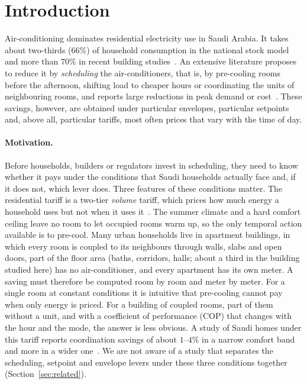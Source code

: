 \documentclass[10pt,a4paper,twocolumn]{article}
\theoremstyle{definition}
\begin{document}
\section{Introduction}\label{sec:intro}
Air-conditioning dominates residential electricity use in Saudi Arabia. It takes about two-thirds ($66\%$) of household consumption in the national stock model~\citep{stockmodel2020} and more than $70\%$ in recent building studies~\citep{passive_saudi2025,retrofit_jeddah2023}. An extensive literature proposes to reduce it by \emph{scheduling} the air-conditioners, that is, by pre-cooling rooms before the afternoon, shifting load to cheaper hours or coordinating the units of neighbouring rooms, and reports large reductions in peak demand or cost~\citep{braun1990,naderi2022precool,mayes2024precool}. These savings, however, are obtained under particular envelopes, particular setpoints and, above all, particular tariffs, most often prices that vary with the time of day.

\paragraph{Motivation.} Before households, builders or regulators invest in scheduling, they need to know whether it pays under the conditions that Saudi households actually face and, if it does not, which lever does. Three features of these conditions matter. The residential tariff is a two-tier \emph{volume} tariff, which prices how much energy a household uses but not when it uses it~\citep{sec_tariff}. The summer climate and a hard comfort ceiling leave no room to let occupied rooms warm up, so the only temporal action available is to pre-cool. Many urban households live in apartment buildings, in which every room is coupled to its neighbours through walls, slabs and open doors, part of the floor area (baths, corridors, halls; about a third in the building studied here) has no air-conditioner, and every apartment has its own meter. A saving must therefore be computed room by room and meter by meter. For a single room at constant conditions it is intuitive that pre-cooling cannot pay when only energy is priced. For a building of coupled rooms, part of them without a unit, and with a coefficient of performance (COP) that changes with the hour and the mode, the answer is less obvious. A study of Saudi homes under this tariff reports coordination savings of about $1$--$4\%$ in a narrow comfort band and more in a wider one~\citep{rl2026hvac}. We are not aware of a study that separates the scheduling, setpoint and envelope levers under these three conditions together (Section~\ref{sec:related}).
\end{document}
